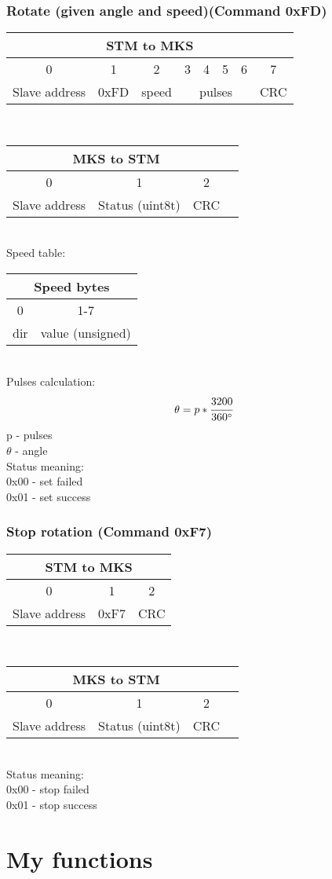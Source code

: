 \documentclass[]{article}
\begin{document}
	\subsubsection*{Rotate (given angle and speed)(Command 0xFD)}
	\begin{tabular}{|c|c|c|c|c|c|c|c|}
		\hline
		\multicolumn{8}{|c|}{STM to MKS} \\ \hline
		0 & 1 & 2 & 3 & 4 & 5 & 6 &7 \\ \hline
		Slave address & 0xFD & speed &\multicolumn{4}{|c|}{pulses} & CRC \\ \hline		
	\end{tabular}\\ 	
	\begin{tabular}{|c|c|c|c|}
		\hline
		\multicolumn{3}{|c|}{MKS to STM} \\ \hline
		0 & 1 & 2  \\ \hline
		Slave address & Status (uint8t) & CRC \\ \hline
	\end{tabular}\\
	Speed table:\\
	\begin{tabular}{|c|c|}
		\hline
		\multicolumn{2}{|c|}{Speed bytes} \\ \hline
		0 & 1-7 \\ \hline
		dir & value (unsigned) \\ \hline
	\end{tabular}\\
	Pulses calculation:
	$$\theta = p*\cfrac{3200}{360^\circ}$$
	p - pulses\\
	$\theta$ - angle\\
	Status meaning:\\
	0x00 - set failed \\
	0x01 - set success \\
	\subsubsection*{Stop rotation (Command 0xF7)}
		\begin{tabular}{|c|c|c|}
		\hline
		\multicolumn{3}{|c|}{STM to MKS} \\ \hline
		0 & 1 & 2 \\ \hline
		Slave address & 0xF7 & CRC \\ \hline		
	\end{tabular}\\ 	
	\begin{tabular}{|c|c|c|c|}
		\hline
		\multicolumn{3}{|c|}{MKS to STM} \\ \hline
		0 & 1 & 2  \\ \hline
		Slave address & Status (uint8t) & CRC \\ \hline
	\end{tabular}\\
		Status meaning:\\
	0x00 - stop failed \\
	0x01 - stop success \\
	\section{My functions}
	
\end{document}
